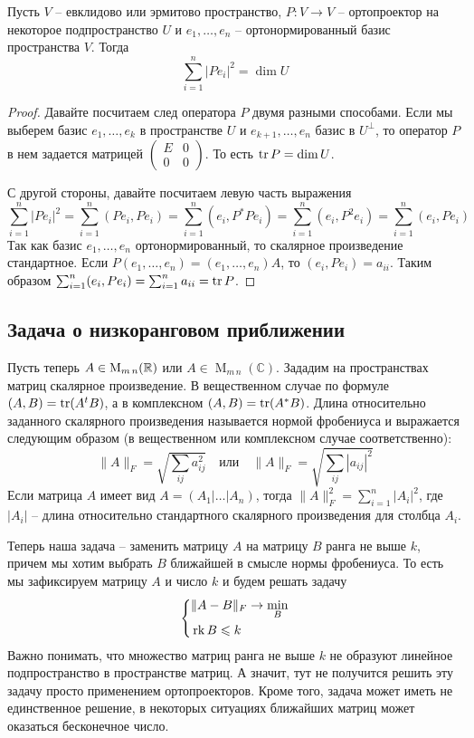 \begin{claim}
Пусть $V$ -- евклидово или эрмитово пространство, $P\colon V\to V$ -- ортопроектор на некоторое подпространство $U$ и $e_1,\ldots,e_n$ -- ортонормированный базис пространства $V$. Тогда
\[
\sum_{i=1}^n |Pe_i|^2 = \dim U
\]
\end{claim}
\begin{proof}
Давайте посчитаем след оператора $P$ двумя разными способами. Если мы выберем базис $e_1,\ldots,e_k$ в пространстве $U$ и $e_{k+1}, \ldots,e_n$ базис в $U^\bot$, то оператор $P$ в нем задается матрицей $\left(\begin{smallmatrix}{E}&{0}\\{0}&{0}\end{smallmatrix}\right)$. То есть $\operatorname{tr} P = \dim U$.

С другой стороны, давайте посчитаем левую часть выражения
\[
\sum_{i=1}^n |Pe_i|^2 = \sum_{i=1}^n (Pe_i, Pe_i) = \sum_{i=1}^n (e_i, P^*Pe_i) = \sum_{i=1}^n (e_i, P^2e_i) = \sum_{i=1}^n (e_i, Pe_i)
\]
Так как базис $e_1,\ldots,e_n$ ортонормированный, то скалярное произведение стандартное. Если $P(e_1,\ldots,e_n) = (e_1,\ldots,e_n)A$, то $(e_i, Pe_i) = a_{ii}$. Таким образом $ \sum_{i=1}^n (e_i, Pe_i) = \sum_{i=1}^na_{ii} = \operatorname{tr} P$.
\end{proof}

\subsection{Задача о низкоранговом приближении}

Пусть теперь $A\in \operatorname{M}_{m\,n}(\mathbb R)$ или $A\in \operatorname{M}_{m\,n}(\mathbb C)$. Зададим на пространствах матриц скалярное произведение. В вещественном случае по формуле $(A, B) = \operatorname{tr}(A^t B)$, а в комплексном $(A, B) = \operatorname{tr}(A^*B)$. Длина относительно заданного скалярного произведения называется нормой фробениуса и выражается следующим образом (в вещественном или комплексном случае соответственно):
\[
\|A\|_F = \sqrt{\sum_{ij}a_{ij}^2}
\quad\text{или}\quad
\|A\|_F = \sqrt{\sum_{ij}|a_{ij}|^2}
\]
Если матрица $A$ имеет вид $A = (A_1|\ldots|A_n)$, тогда $\|A\|_F^2 = \sum_{i=1}^n |A_i|^2$, где $|A_i|$ -- длина относительно стандартного скалярного произведения для столбца $A_i$.

Теперь наша задача -- заменить матрицу $A$ на матрицу $B$ ранга не выше $k$, причем мы хотим выбрать $B$ ближайшей в смысле нормы фробениуса. То есть мы зафиксируем матрицу $A$ и число $k$ и будем решать задачу
\[
\left\{
\begin{aligned}
&\|A - B\|_F \to \min_B\\
&\operatorname{rk} B \leqslant k
\end{aligned}
\right.
\]
Важно понимать, что множество матриц ранга не выше $k$ не образуют линейное подпространство в пространстве матриц. А значит, тут не получится решить эту задачу просто применением ортопроекторов. Кроме того, задача может иметь не единственное решение, в некоторых ситуациях ближайших матриц может оказаться бесконечное число.

